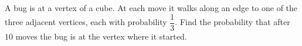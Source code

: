 A bug is at a vertex of a cube. At each move it walks along an edge to one of the three adjacent vertices, each with probability $\dfrac{1}{3}$. Find the probability that after $10$ moves the bug is at the vertex where it started.
